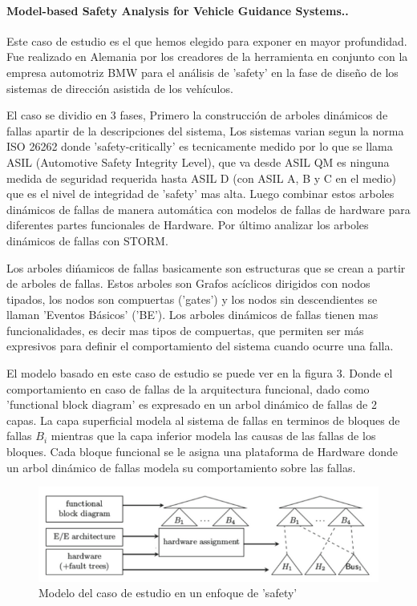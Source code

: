\documentclass[11pt]{article}
\begin{document}
\paragraph{Model-based Safety Analysis for Vehicle Guidance Systems.\cite{Majdi}.} 

Este caso de estudio es el que hemos elegido para exponer en mayor profundidad. Fue realizado en Alemania por los creadores de la herramienta en conjunto con la empresa automotriz BMW para el an\'alisis de 'safety' en la fase de dise\~no de los sistemas de direcci\'on asistida de los veh\'iculos.

El caso se dividio en 3 fases, Primero la construcci\'on de arboles din\'amicos de fallas apartir de la descripciones del sistema, Los sistemas varian segun la norma ISO 26262 donde 'safety-critically' es tecnicamente medido por lo que se llama ASIL (Automotive Safety Integrity Level), que va desde ASIL QM es ninguna medida de seguridad requerida hasta ASIL D (con ASIL A, B y C en el medio) que es el nivel de integridad de 'safety' mas alta. Luego combinar estos arboles din\'amicos de fallas de manera autom\'atica con modelos de fallas de hardware para diferentes partes funcionales de Hardware. Por \'ultimo  analizar los arboles din\'amicos de fallas con STORM.

Los arboles di\'namicos de fallas basicamente son estructuras que se crean a partir de arboles de fallas. Estos arboles son Grafos ac\'iclicos dirigidos con nodos tipados, los nodos son compuertas ('gates') y los nodos sin descendientes se llaman 'Eventos B\'asicos' ('BE'). Los arboles din\'amicos de fallas tienen mas funcionalidades, es decir mas tipos de compuertas, que permiten ser m\'as expresivos para definir el comportamiento del sistema cuando ocurre una falla.

El modelo basado en este caso de estudio se puede ver en la figura 3. Donde el comportamiento en caso de fallas de la arquitectura funcional, dado como 'functional block diagram' es expresado en un arbol din\'amico de fallas de 2 capas. La capa superficial modela al sistema de fallas en terminos de bloques de fallas $B_i$ mientras que la capa inferior modela las causas de las fallas de los bloques. Cada bloque funcional se le asigna una plataforma de Hardware donde un arbol din\'amico de fallas modela su comportamiento sobre las fallas.

\begin{figure}[h]
	\includegraphics[scale=0.43]{modelbased.png} 
	\centering
	\caption{Modelo del caso de estudio en un enfoque de 'safety'}%
\end{figure}
\end{document}
